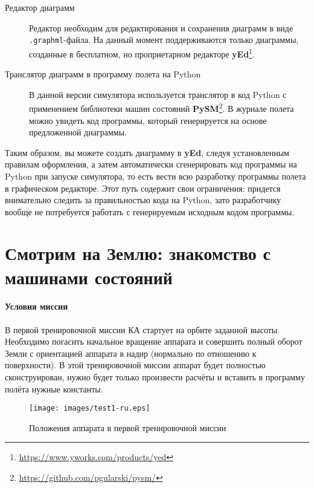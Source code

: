 \documentclass[12pt,a4paper]{article}
\begin{document}
\begin{description}
\item[Редактор диаграмм] Редактор необходим для редактирования и сохранения диаграмм в
  виде \verb'.graphml'-файла. На данный момент поддерживаются только диаграммы, созданные
  в бесплатном, но проприетарном редакторе
  \textbf{yEd}\footnote{\url{https://www.yworks.com/products/yed}}.
\item[Транслятор диаграмм в программу полета на Python] В данной версии симулятора
  используется транслятор в код Python с применением библиотеки машин состояний
  \textbf{PySM}\footnote{\url{https://github.com/pgularski/pysm/}}. В журнале полета можно
  увидеть код программы, который генерируется на основе предложенной диаграммы.
\end{description}

Таким образом, вы можете создать диаграмму в \textbf{yEd}, следуя установленным правилам
оформления, а затем автоматически сгенерировать код программы на Python при запуске
симулятора, то есть вести всю разработку программы полета в графическом редакторе. Этот
путь содержит свои ограничения: придется внимательно следить за правильностью кода на
Python, зато разработчику вообще не потребуется работать с генерируемым исходным кодом
программы.

\clearpage
\section{Смотрим на Землю: знакомство с машинами состояний}

\paragraph{Условия миссии} В первой тренировочной миссии КА стартует на орбите заданной высоты. Необходимо погасить
начальное вращение аппарата и совершить полный оборот Земли с ориентацией аппарата в надир
(нормально по отношению к поверхности). В этой тренировочной миссии аппарат будет
полностью сконструирован, нужно будет только произвести расчёты и вставить в программу
полёта нужные константы.

\begin{figure}[tbh]
  \begin{center}
    \texttt{[image: images/test1-ru.eps]}
    \caption{Положения аппарата в первой тренировочной миссии}
    \label{Pic:test1}
  \end{center}
\end{figure}
\end{document}

